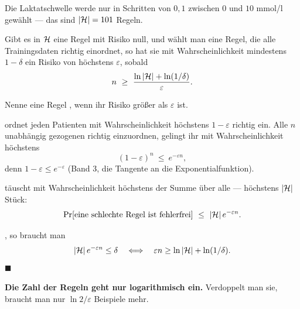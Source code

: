 \begin{merksatz}
Die Laktatschwelle werde nur in Schritten von $0{,}1$ zwischen $0$ und $10$ mmol/l gewählt --- das sind $|\mathcal{H}| = 101$ Regeln.

Gibt es in $\mathcal{H}$ eine Regel mit Risiko null, und wählt man eine Regel, die alle Trainingsdaten richtig einordnet, so hat sie mit Wahrscheinlichkeit mindestens $1-\delta$ ein Risiko von höchstens $\varepsilon$, sobald
\[ n \ \ge\ \frac{\ln|\mathcal{H}| + \ln(1/\delta)}{\varepsilon} . \]

Nenne eine Regel , wenn ihr Risiko größer als $\varepsilon$ ist.

 ordnet jeden Patienten mit Wahrscheinlichkeit höchstens $1-\varepsilon$ richtig ein. Alle $n$ unabhängig gezogenen richtig einzuordnen, gelingt ihr mit Wahrscheinlichkeit höchstens
\[ (1-\varepsilon)^{n} \ \le\ e^{-\varepsilon n} , \]
denn $1-\varepsilon \le e^{-\varepsilon}$ (Band 3, die Tangente an die Exponentialfunktion).

 täuscht mit Wahrscheinlichkeit höchstens der Summe über alle --- höchstens $|\mathcal{H}|$ Stück:
\[ \Pr[\text{eine schlechte Regel ist fehlerfrei}] \ \le\ |\Hyp|\,e^{-\varepsilon n} . \]

, so braucht man
\[ |\mathcal{H}|\,e^{-\varepsilon n} \le \delta \quad\Longleftrightarrow\quad \varepsilon n \ge \ln|\mathcal{H}| + \ln(1/\delta) . \]
$\blacksquare$

\begin{center}
\begin{minipage}{0.9\textwidth}
\textbf{Die Zahl der Regeln geht nur logarithmisch ein.} Verdoppelt man sie, braucht man nur $\ln2/\varepsilon$ Beispiele mehr.
\end{minipage}
\end{center}
\end{merksatz}

